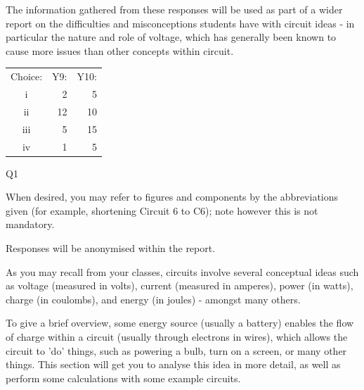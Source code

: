 \documentclass[a4paper,openany,nobib]{tufte-book}
\begin{document}
The information gathered from these responses will be used as part of a wider report on the difficulties and misconceptions students have with circuit ideas - in particular the nature and role of voltage, which has generally been known to cause more issues than other concepts within circuit.

\begin{margintable}
  \begin{center}
    \begin{tabular}{crr}
      \toprule
      Choice: & Y9: & Y10:\\
      i & 2 & 5 \\
      ii & 12 & 10\\
      iii & 5 & 15\\
      iv & 1 & 5\\
      \bottomrule
    \end{tabular}
	\caption{\centering Q1}
  \end{center}
\end{margintable}
When desired, you may refer to figures and components by the abbreviations given (for example, shortening Circuit 6 to C6); note however this is not mandatory.

Responses will be anonymised within the report.


As you may recall from your classes, circuits involve several conceptual ideas such as voltage (measured in volts), current (measured in amperes), power (in watts), charge (in coulombs), and energy (in joules) - amongst many others. 

To give a brief overview, some energy source (usually a battery) enables the flow of charge within a circuit (usually through electrons in wires), which allows the circuit to 'do' things, such as powering a bulb, turn on a screen, or many other things. This section will get you to analyse this idea in more detail, as well as perform some calculations with some example circuits.
\end{document}
